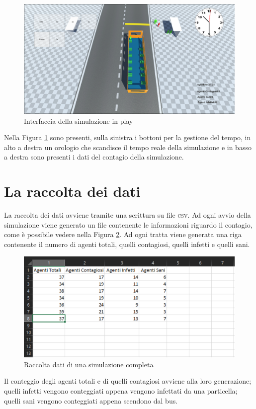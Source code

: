 \documentclass[12pt, openany]{book}
\begin{document}
\begin{figure}[H]
	\centering
	\includegraphics[width=0.8\linewidth]{"Immagini/PlayGui.png"}
	\caption{Interfaccia della simulazione in play}
	\label{fig:InterfacciaPlay}
\end{figure}
Nella Figura \ref{fig:InterfacciaPlay} sono presenti, sulla sinistra i bottoni per la gestione del tempo, in alto a destra un orologio che scandisce il tempo reale della simulazione e in basso a destra sono presenti i dati del contagio della simulazione.
		\section{La raccolta dei dati}
	La raccolta dei dati avviene tramite una scrittura su file \textsc{csv}. Ad ogni avvio della simulazione viene generato un file contenente le informazioni riguardo il contagio, come è possibile vedere nella Figura \ref{fig:csv}. Ad ogni tratta viene generata una riga contenente il numero di agenti totali, quelli contagiosi, quelli infetti e quelli sani.
	\begin{figure}[H]
		\centering
		\includegraphics[width=1\linewidth]{"Immagini/csv.png"}
		\caption{Raccolta dati di una simulazione completa}
		\label{fig:csv}
	\end{figure}
	Il conteggio degli agenti totali e di quelli contagiosi avviene alla loro generazione; quelli infetti vengono conteggiati appena vengono infettati da una particella; quelli sani vengono conteggiati appena scendono dal bus.
\end{document}
